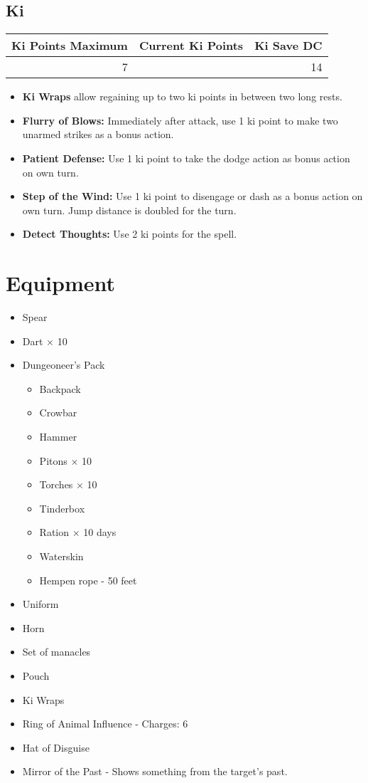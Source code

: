 \documentclass[11pt]{article}
\begin{document}
\subsection{Ki}
\label{sec:orgcece080}

\begin{center}
\label{tab:org7c6e5cf}
\begin{tabular}{rlr}
Ki Points Maximum & Current Ki Points & Ki Save DC\\
\hline
7 &  & 14\\
\end{tabular}
\end{center}

\begin{itemize}
\item \textbf{Ki Wraps} allow regaining up to two ki points in between two long rests.
\item \textbf{Flurry of Blows:} Immediately after attack, use 1 ki point to make two unarmed
strikes as a bonus action.
\item \textbf{Patient Defense:} Use 1 ki point to take the dodge action as bonus action on
own turn.
\item \textbf{Step of the Wind:} Use 1 ki point to disengage or dash as a bonus action on own
turn. Jump distance is doubled for the turn.
\item \textbf{Detect Thoughts:} Use 2 ki points for the spell.
\end{itemize}

\section{Equipment}
\label{sec:org197afc1}

\begin{itemize}
\item Spear
\item Dart × 10
\item Dungeoneer's Pack
\begin{itemize}
\item Backpack
\item Crowbar
\item Hammer
\item Pitons × 10
\item Torches × 10
\item Tinderbox
\item Ration × 10 days
\item Waterskin
\item Hempen rope - 50 feet
\end{itemize}
\item Uniform
\item Horn
\item Set of manacles
\item Pouch
\item Ki Wraps
\item Ring of Animal Influence - Charges: 6
\item Hat of Disguise
\item Mirror of the Past - Shows something from the target's past.
\end{itemize}
\end{document}
